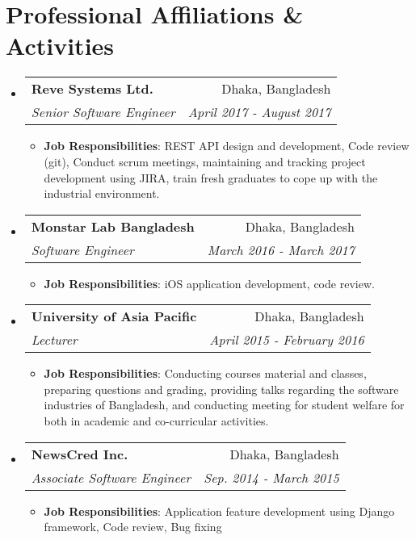 \documentclass[letterpaper,11pt]{article}
\makeatletter
\newcommand{\resumeItem}[2]{
  \item\small{
    \textbf{#1}{: #2 \vspace{-2pt}}
  }
}
\newcommand{\resumeSubheading}[4]{
  \vspace{-1pt}\item
    \begin{tabular*}{0.97\textwidth}{l@{\extracolsep{\fill}}r}
      \textbf{#1} & #2 \\
      \textit{\small#3} & \textit{\small #4} \\
    \end{tabular*}\vspace{-5pt}
}
\newcommand{\resumeSubHeadingListStart}{\begin{itemize}[leftmargin=*]}
\newcommand{\resumeSubHeadingListEnd}{\end{itemize}}
\newcommand{\resumeItemListStart}{\begin{itemize}}
\newcommand{\resumeItemListEnd}{\end{itemize}\vspace{-5pt}}
\makeatother
\begin{document}
\section{Professional Affiliations \& Activities}
    \resumeSubHeadingListStart
        \resumeSubheading
            {Reve Systems Ltd.}
            {Dhaka, Bangladesh}
            {Senior Software Engineer}
            {April 2017 - August 2017}
            \resumeItemListStart
                \resumeItem
                    {Job Responsibilities}
                    {REST API design and development, Code review (git), Conduct scrum meetings, maintaining and tracking project development using JIRA, train fresh graduates to cope up with the industrial environment.}
            \resumeItemListEnd
        \resumeSubheading
            {Monstar Lab Bangladesh}
            {Dhaka, Bangladesh}
            {Software Engineer}
            {March 2016 - March 2017}
            \resumeItemListStart
                \resumeItem
                    {Job Responsibilities}
                    {iOS application development, code review.}
            \resumeItemListEnd
        \resumeSubheading
            {University of Asia Pacific}
            {Dhaka, Bangladesh}
            {Lecturer}
            { April 2015 - February 2016}
            \resumeItemListStart
                \resumeItem
                    {Job Responsibilities}
                    {Conducting courses material and classes, preparing questions and grading, providing talks regarding the software industries of Bangladesh, and conducting meeting for student welfare for both in academic and co-curricular activities.}%
            \resumeItemListEnd
        \resumeSubheading
            {NewsCred Inc.}
            {Dhaka, Bangladesh}
            {Associate Software Engineer}
            { Sep. 2014 - March 2015}
            \resumeItemListStart
                \resumeItem
                    {Job Responsibilities}
                    {Application feature development using Django framework, Code review, Bug fixing}
            \resumeItemListEnd
    \resumeSubHeadingListEnd
\end{document}
